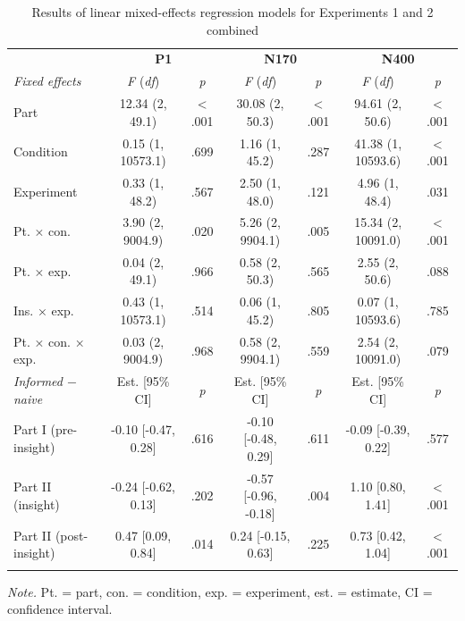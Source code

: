\documentclass[
  english,
  man,11pt,floatsintext]{apa7}
\begin{document}
\begin{table}[tbp]

\begin{center}
\begin{threeparttable}

\caption{\label{tab:joint-table}Results of linear mixed-effects regression models for Experiments 1 and 2 combined}

\footnotesize{

\begin{tabular}{lcccccc}
\toprule
 & \multicolumn{2}{c}{\textbf{P1}} & \multicolumn{2}{c}{\textbf{N170}} & \multicolumn{2}{c}{\textbf{N400}} \\
\cmidrule(r){2-3} \cmidrule(r){4-5} \cmidrule(r){6-7}
\textit{Fixed effects} & \textit{F} (\textit{df}) & \textit{p} & \textit{F} (\textit{df}) & \textit{p} & \textit{F} (\textit{df}) & \textit{p}\\
\midrule
Part & 12.34 (2, 49.1) & < .001 & 30.08 (2, 50.3) & < .001 & 94.61 (2, 50.6) & < .001\\
Condition & 0.15 (1, 10573.1) & .699 & 1.16 (1, 45.2) & .287 & 41.38 (1, 10593.6) & < .001\\
Experiment & 0.33 (1, 48.2) & .567 & 2.50 (1, 48.0) & .121 & 4.96 (1, 48.4) & .031\\
Pt. × con. & 3.90 (2, 9004.9) & .020 & 5.26 (2, 9904.1) & .005 & 15.34 (2, 10091.0) & < .001\\
Pt. × exp. & 0.04 (2, 49.1) & .966 & 0.58 (2, 50.3) & .565 & 2.55 (2, 50.6) & .088\\
Ins. × exp. & 0.43 (1, 10573.1) & .514 & 0.06 (1, 45.2) & .805 & 0.07 (1, 10593.6) & .785\\
Pt. × con. × exp. & 0.03 (2, 9004.9) & .968 & 0.58 (2, 9904.1) & .559 & 2.54 (2, 10091.0) & .079\\
\textit{Informed $-$  naive} & Est. [95\% CI] & \textit{p} & Est. [95\% CI] & \textit{p} & Est. [95\% CI] & \textit{p}\\ \midrule
Part I (pre-insight) & -0.10 [-0.47, 0.28] & .616 & -0.10 [-0.48, 0.29] & .611 & -0.09 [-0.39, 0.22] & .577\\
Part II (insight) & -0.24 [-0.62, 0.13] & .202 & -0.57 [-0.96, -0.18] & .004 & 1.10 [0.80, 1.41] & < .001\\
Part II (post-insight) & 0.47 [0.09, 0.84] & .014 & 0.24 [-0.15, 0.63] & .225 & 0.73 [0.42, 1.04] & < .001\\
\bottomrule
\addlinespace
\end{tabular}

}

\begin{tablenotes}[para]
\normalsize{\textit{Note.} Pt. = part, con. = condition, exp. = experiment, est. = estimate, CI = confidence interval.}
\end{tablenotes}

\end{threeparttable}
\end{center}

\end{table}
\end{document}

